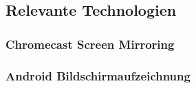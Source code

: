 \subsection{Relevante Technologien}

\subsubsection{Chromecast Screen Mirroring}

\subsubsection{Android Bildschirmaufzeichnung}